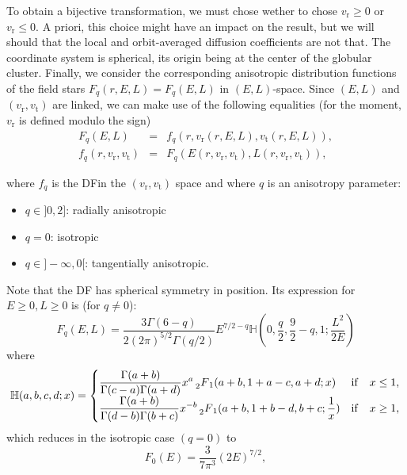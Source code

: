\documentclass[11pt]{article}
\newcommand{\DF}{\ac{DF}}
\newcommand{\rt}{\mathrm{t}}
\newcommand{\rr}{\mathrm{r}}
\newcommand{\vr}{v_{\rr}}
\newcommand{\vt}{v_{\rt}}
\newcommand{\Fq}{F_{q}}
\newcommand{\fq}{f_{q}}
\newcommand{\mH}{\mathbb{H}}
\newcommand{\HG}{\prescript{}{2}F_{1}}
\begin{document}
To obtain a bijective transformation, we must chose wether to chose
$\vr\ge 0$ or $\vr\leq 0$. A priori, this choice might have an
impact on the result, but we will should that the local and orbit-averaged
diffusion coefficients are not that. The coordinate system is spherical,
its origin being at the center of the globular cluster. Finally, we
consider the corresponding anisotropic distribution functions of the
field stars $\Fq(r,E,L)= \Fq(E,L)$ in $(E,L)$-space. Since $(E,L)$
and $(\vr,\vt)$ are linked, we can make use of the following
equalities (for the moment, $\vr$ is defined modulo the sign)
\begin{equation}
\begin{array}{ccl}
\Fq(E,L) &=&\displaystyle{\fq(r,\vr(r,E,L),\vt(r,E,L))} ,\\
\fq(r,\vr,\vt)&=&\displaystyle{F_{q}(E(r,\vr,\vt),L(r,\vr,\vt))} ,
\end{array}
\label{eq:conversion_DF}
\end{equation}

where $\fq$ is the \DF in the $(\vr,\vt)$ space and where $q$ is an anisotropy
parameter:
\begin{itemize}
\item $q\in]0,2]$: radially anisotropic
\item $q=0$: isotropic
\item $q\in]-\infty,0[$: tangentially anisotropic.
\end{itemize}

Note that the DF has spherical symmetry in position. Its expression for $E \geq 0, L \geq 0$
is (for $q \neq0$):
\begin{equation}
  \Fq(E,L)=\frac{3\Gamma(6-q)}{2(2\pi)^{5/2}\Gamma(q/2)}E^{7/2-q}\mH(0,\frac{q}{2},\frac{9}{2}-q,1;\frac{L^{2}}{2E})
  \label{eq:def_Fq}
\end{equation}
where
\begin{equation}
\mH(a,b,c,d;x)=\begin{cases}
\displaystyle{\frac{\Gamma(a+b)}{\Gamma(c-a)\Gamma(a+d)}x^{a} \HG(a+b,1+a-c,a+d;x)} & {\rm{if}} \quad x\leq1 ,\\
\displaystyle{\frac{\Gamma(a+b)}{\Gamma(d-b)\Gamma(b+c)}x^{-b} \HG(a+b,1+b-d,b+c;\frac{1}{x})} &{\rm{if}} \quad x\geq1 ,
\end{cases}
\label{eq:def_H}
\end{equation}
which reduces in the isotropic case $(q=0)$ to
\begin{equation}
  F_{0}(E)=\frac{3}{7\pi^{3}}(2E)^{7/2} ,
  \label{eq:F_q=0}
\end{equation}
\end{document}

